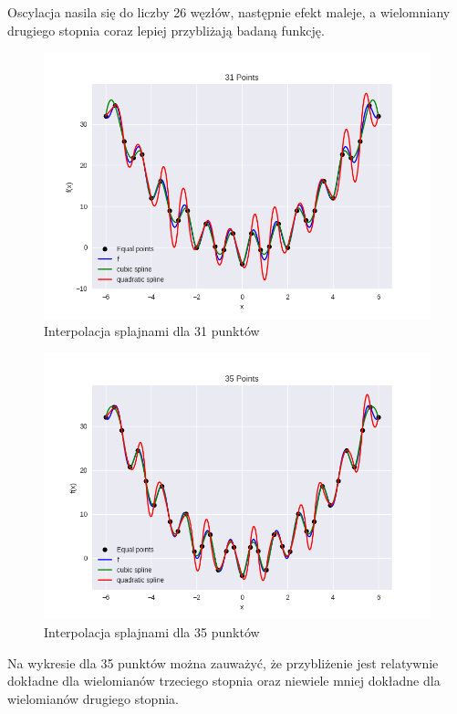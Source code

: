 \documentclass{article}
\begin{document}
Oscylacja nasila się do liczby 26 węzłów, następnie efekt maleje, a wielomniany drugiego stopnia coraz lepiej przybliżają badaną funkcję.

\begin{figure}[H]
    \centering
    \includegraphics[width=\textwidth]{img/spline_31.png}
    \caption{Interpolacja splajnami dla 31 punktów}
\end{figure}

\begin{figure}[H]
    \centering
    \includegraphics[width=\textwidth]{img/spline_35.png}
    \caption{Interpolacja splajnami dla 35 punktów}
\end{figure}

Na wykresie dla 35 punktów można zauważyć, że przybliżenie jest relatywnie dokładne dla wielomianów trzeciego stopnia oraz niewiele mniej dokładne
dla wielomianów drugiego stopnia.
\end{document}
